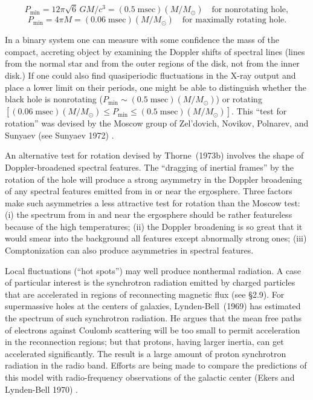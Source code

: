 \[
P_{\min} = 12\pi \sqrt{6}\, GM/c^3 = (0.5 \;\text{msec})(M/M_\odot)
\quad \text{for nonrotating hole},
\]
\[
P_{\min} = 4\pi M = (0.06 \;\text{msec})(M/M_\odot)
\quad \text{for maximally rotating hole}.
\]

In a binary system one can measure with some confidence the mass of the
compact, accreting object by examining the Doppler shifts of spectral lines
(lines from the normal star and from the outer regions of the disk, not from
the inner disk.) If one could also find quasiperiodic fluctuations in the X-ray
output and place a lower limit on their periods, one might be able to distinguish
whether the black hole is nonrotating ($P_{\min} \sim (0.5\;\text{msec})(M/M_\odot)$) or rotating
$[(0.06\;\text{msec})(M/M_\odot) \leq P_{\min} \leq (0.5\;\text{msec})(M/M_\odot)]$. This ``test for rotation'' was
devised by the Moscow group of Zel'dovich, Novikov, Polnarev, and Sunyaev
(see Sunyaev 1972) \cite{Sunyaev1972}.

An alternative test for rotation devised by Thorne~(1973b) \cite{Thorne1973b} involves the shape
of Doppler-broadened spectral features. The ``dragging of inertial frames'' by the
rotation of the hole will produce a strong asymmetry in the Doppler broadening
of any spectral features emitted from in or near the ergosphere. Three factors
make such asymmetries a less attractive test for rotation than the Moscow test:
(i) the spectrum from in and near the ergosphere should be rather featureless
because of the high temperatures; (ii) the Doppler broadening is so great that
it would smear into the background all features except abnormally strong ones;
(iii) Comptonization can also produce asymmetries in spectral features.

Local fluctuations (``hot spots'') may well produce nonthermal radiation. A
case of particular interest is the synchrotron radiation emitted by charged particles
that are accelerated in regions of reconnecting magnetic flux (see \S2.9). For
supermassive holes at the centers of galaxies, Lynden-Bell~(1969) \cite{LyndenBell1969} has estimated
the spectrum of such synchrotron radiation. He argues that the mean free paths
of electrons against Coulomb scattering will be too small to permit acceleration
in the reconnection regions; but that protons, having larger inertia, can get
accelerated significantly. The result is a large amount of proton synchrotron
radiation in the radio band. Efforts are being made to compare the predictions
of this model with radio-frequency observations of the galactic center (Ekers
and Lynden-Bell 1970) \cite{EkersLyndenBell1970}.

